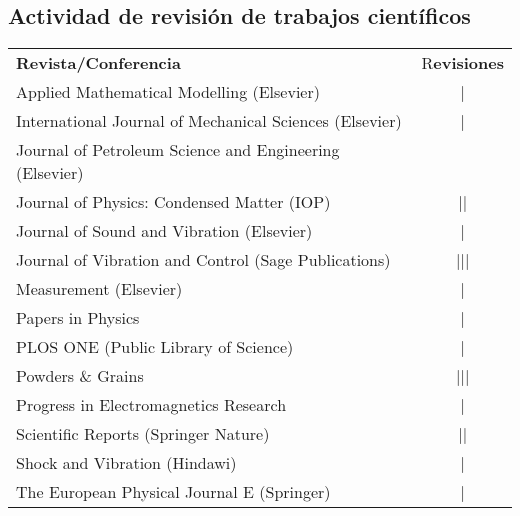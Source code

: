 \subsection{Actividad de revisión de trabajos científicos}
\begin{tabular}{l c}
    \textbf{Revista/Conferencia} & R\textbf{evisiones} \\
    Applied Mathematical Modelling (Elsevier) & | \\ 
    International Journal of Mechanical Sciences (Elsevier) & | \\
    Journal of Petroleum Science and Engineering (Elsevier) & \cancel{||||} \\
    Journal of Physics: Condensed Matter (IOP) & || \\
    Journal of Sound and Vibration (Elsevier) & \cancel{||||} | \\
    Journal of Vibration and Control (Sage Publications) & ||| \\
    Measurement (Elsevier) &  | \\
    Papers in Physics & | \\
    PLOS ONE (Public Library of Science) & | \\
    Powders \& Grains & ||| \\
    Progress in Electromagnetics Research & | \\
    Scientific Reports (Springer Nature) & || \\
    Shock and Vibration (Hindawi) &  | \\
    The European Physical Journal E (Springer) & | 
\end{tabular}

